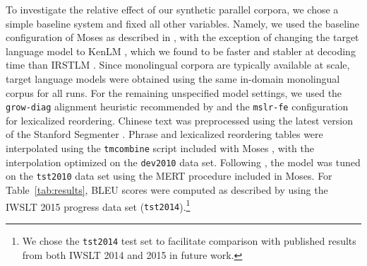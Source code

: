 To investigate the relative effect of our synthetic parallel corpora, we chose a simple baseline system and fixed all other variables.
Namely, we used the baseline configuration of Moses  as described in , with the exception of changing the target language model to KenLM , which we found to be faster and stabler at decoding time than IRSTLM .
Since monolingual corpora are typically available at scale, target language models were obtained using the same in-domain monolingual corpus for all runs.
For the remaining unspecified model settings, we used the {\small \tt grow-diag} alignment heuristic recommended by  and the {\small \tt mslr-fe} configuration for lexicalized reordering. 
Chinese text was preprocessed using the latest version of the Stanford Segmenter .
Phrase and lexicalized reordering tables were interpolated using the {\small \tt tmcombine} script included with Moses , with the interpolation optimized on the {\small \tt dev2010} data set.
Following , the model was tuned on the {\small \tt tst2010} data set using the MERT procedure included in Moses.
For Table~\ref{tab:results}, BLEU scores were computed as described by  using the IWSLT 2015 progress data set ({\small \tt tst2014}).\footnote{
    We chose the {\small \tt tst2014} test set to facilitate comparison with published results from both IWSLT 2014 and 2015 in future work.
} %




